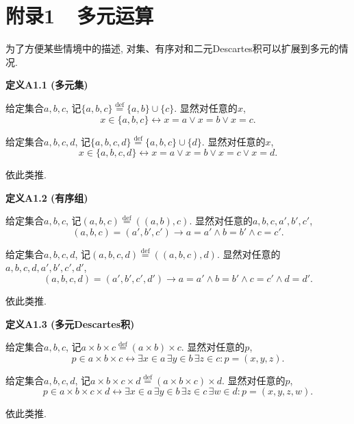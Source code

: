 \vspace{20pt}

\section*{附录1\ \ 多元运算}

为了方便某些情境中的描述, 对集、有序对和二元Descartes积可以扩展到多元的情况.

\vspace{10pt}

\hypertarget{sec:定义A1.1}{}
\noindent\textbf{定义A1.1 (多元集)}

给定集合$a,b,c$, 记$\{a,b,c\}\overset{\mathrm{def}}{=}\{a,b\}\cup\{c\}$.
显然对任意的$x$,
\[
    x\in\{a,b,c\}\leftrightarrow x=a\lor x=b\lor x=c.
\]

给定集合$a,b,c,d$, 记$\{a,b,c,d\}\overset{\mathrm{def}}{=}\{a,b,c\}\cup\{d\}$.
显然对任意的$x$,
\[
    x\in\{a,b,c,d\}\leftrightarrow x=a\lor x=b\lor x=c\lor x=d.
\]

依此类推.

\vspace{10pt}

\hypertarget{sec:定义A1.2}{}
\noindent\textbf{定义A1.2 (有序组)}

给定集合$a,b,c$, 记$(a,b,c)\overset{\mathrm{def}}{=}((a,b),c)$.
显然对任意的$a,b,c,a',b',c'$,
\[
    (a,b,c)=(a',b',c')\to a=a'\land b=b'\land c=c'.
\]

给定集合$a,b,c,d$, 记$(a,b,c,d)\overset{\mathrm{def}}{=}((a,b,c),d)$.
显然对任意的$a,b,c,d,a',b',c',d'$,
\[
    (a,b,c,d)=(a',b',c',d')\to a=a'\land b=b'\land c=c'\land d=d'.
\]

依此类推.

\vspace{10pt}

\hypertarget{sec:定义A1.3}{}
\noindent\textbf{定义A1.3 (多元Descartes积)}

给定集合$a,b,c$, 记$a\times b\times c\overset{\mathrm{def}}{=}
(a\times b)\times c$. 显然对任意的$p$,
\[
    p\in a\times b\times c\leftrightarrow
    \exists x\in a\,\exists y\in b\,\exists z\in c:p=(x,y,z).
\]

给定集合$a,b,c,d$, 记$a\times b\times c\times d\overset{\mathrm{def}}{=}
(a\times b\times c)\times d$. 显然对任意的$p$,
\[
    p\in a\times b\times c\times d\leftrightarrow
    \exists x\in a\,\exists y\in b\,\exists z\in c\,\exists w\in d:p=(x,y,z,w).
\]

依此类推.

